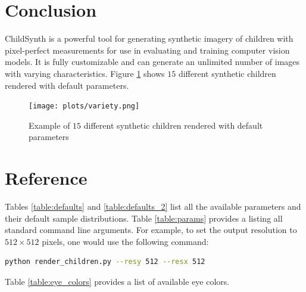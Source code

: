\documentclass{article}
\begin{document}
\section{Conclusion}
ChildSynth is a powerful tool for generating synthetic imagery of children with pixel-perfect measurements for use in evaluating and training computer vision models. It is fully customizable and can generate an unlimited number of images with varying characteristics. Figure \ref{fig:variety} shows $15$ different synthetic children rendered with default parameters.

\begin{figure}[]
    \centering
    \texttt{[image: plots/variety.png]}
    \caption{Example of $15$ different synthetic children rendered with default parameters}
    \label{fig:variety}
\end{figure}



\section{Reference}

Tables \ref{table:defaults} and \ref{table:defaults_2} list all the available parameters and their default sample distributions. Table \ref{table:params} provides a listing all standard command line arguments. For example, to set the output resolution to $512 \times 512$ pixels, one would use the following command:

\begin{lstlisting}[language=bash]
python render_children.py --resy 512 --resx 512\end{lstlisting}

Table \ref{table:eye_colors} provides a list of available eye colors.
\end{document}
